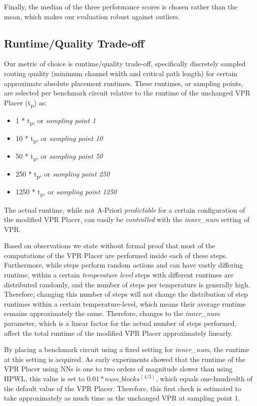 Finally, the median of the three performance scores is chosen rather than the mean, which makes our evaluation robust against outliers.

\subsection{Runtime/Quality Trade-off}

Our metric of choice is runtime/quality trade-off, specifically discretely sampled routing quality (minimum channel width and critical path length) for certain approximate absolute placement runtimes. These runtimes, or sampling points, are selected per benchmark circuit relative to the runtime of the unchanged \gls{VPR} Placer (t\textsubscript{p}) as:

\begin{itemize}
	\item 1   * t\textsubscript{p}, or \textit{sampling point 1}
	\item 10  * t\textsubscript{p}, or \textit{sampling point 10}
	\item 50  * t\textsubscript{p}, or \textit{sampling point 50}
	\item 250 * t\textsubscript{p}, or \textit{sampling point 250}
	\item 1250 * t\textsubscript{p}, or \textit{sampling point 1250}
\end{itemize}

The actual runtime, while not A-Priori \textit{predictable} for a certain configuration of the modified \gls{VPR} Placer, can easily be \textit{controlled} with the \textit{inner\_num} setting of \gls{VPR}.\cite{vtr8} 

Based on observations we state without formal proof that most of the computations of the \gls{VPR} Placer are performed inside each of these steps. Furthermore, while steps perform random actions and can have vastly differing runtime, within a certain \textit{temperature level} steps with different runtimes are distributed randomly, and the number of steps per temperature is generally high. Therefore, changing this number of steps will not change the distribution of step runtimes within a certain temperature-level, which means their average runtime remains approximately the same. Therefore, changes to the \textit{inner\_num} parameter, which is a linear factor for the actual number of steps performed, affect the total runtime of the modified \gls{VPR} Placer approximately linearly.

By placing a benchmark circuit using a fixed setting for \textit{inner\_num}, the runtime at this setting is acquired. As early experiments showed that the runtime of the \gls{VPR} Placer using \glspl{NN} is one to two orders of magnitude slower than using \gls{HPWL}, this value is set to $0.01*num\_blocks^(4/3)$, which equals one-hundredth of the default value of the \gls{VPR} Placer. Therefore, this first check is estimated to take approximately as much time as the unchanged \gls{VPR} at sampling point 1.

